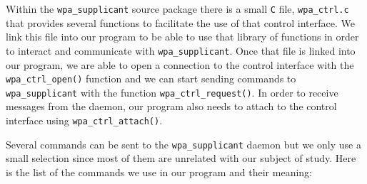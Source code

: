 Within the \texttt{wpa\_supplicant} source package there is a small \texttt{C} file, \texttt{wpa\_ctrl.c} that provides several functions to facilitate the use of that control interface. We link this file into our program to be able to use that library of functions in order to interact and communicate with \texttt{wpa\_supplicant}. Once that file is linked into our program, we are able to open a connection to the control interface with the \texttt{wpa\_ctrl\_open()} function and we can start sending commands to \texttt{wpa\_supplicant} with the function \texttt{wpa\_ctrl\_request()}. In order to receive messages from the daemon, our program also needs to attach to the control interface using \texttt{wpa\_ctrl\_attach()}.

Several commands can be sent to the \texttt{wpa\_supplicant} daemon but we only use a small selection since most of them are unrelated with our subject of study. Here is the list of the commands we use in our program and their meaning:

